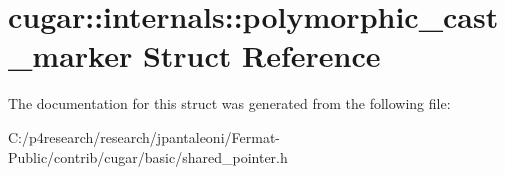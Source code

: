\hypertarget{structcugar_1_1internals_1_1polymorphic__cast__marker}{}\section{cugar\+:\+:internals\+:\+:polymorphic\+\_\+cast\+\_\+marker Struct Reference}
\label{structcugar_1_1internals_1_1polymorphic__cast__marker}


The documentation for this struct was generated from the following file\+:\begin{DoxyCompactItemize}
\item 
C\+:/p4research/research/jpantaleoni/\+Fermat-\/\+Public/contrib/cugar/basic/shared\+\_\+pointer.\+h\end{DoxyCompactItemize}
